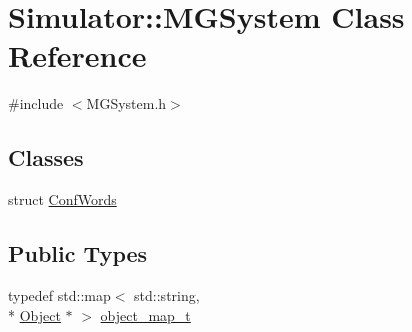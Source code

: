 \hypertarget{class_simulator_1_1_m_g_system}{\section{Simulator\+:\+:M\+G\+System Class Reference}
\label{class_simulator_1_1_m_g_system}
}


{\ttfamily \#include $<$M\+G\+System.\+h$>$}

\subsection*{Classes}
\begin{DoxyCompactItemize}
\item 
struct \hyperlink{struct_simulator_1_1_m_g_system_1_1_conf_words}{Conf\+Words}
\end{DoxyCompactItemize}
\subsection*{Public Types}
\begin{DoxyCompactItemize}
\item 
typedef std\+::map$<$ std\+::string, \\*
\hyperlink{class_simulator_1_1_object}{Object} $\ast$ $>$ \hyperlink{class_simulator_1_1_m_g_system_ae7bb90912b7e1348ab3ddefa4e8bc431}{object\+\_\+map\+\_\+t}
\end{DoxyCompactItemize}
